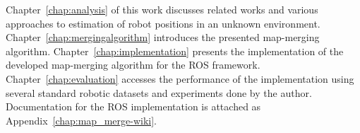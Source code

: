 Chapter~\ref{chap:analysis} of this work discusses related works and various approaches to estimation of robot positions in an unknown environment. Chapter~\ref{chap:mergingalgorithm} introduces the presented map-merging algorithm. Chapter~\ref{chap:implementation} presents the implementation of the developed map-merging algorithm for the \gls{ROS} framework. Chapter~\ref{chap:evaluation} accesses the performance of the implementation using several standard robotic datasets and experiments done by the author. Documentation for the \gls{ROS} implementation is attached as Appendix~\ref{chap:map_merge-wiki}.
